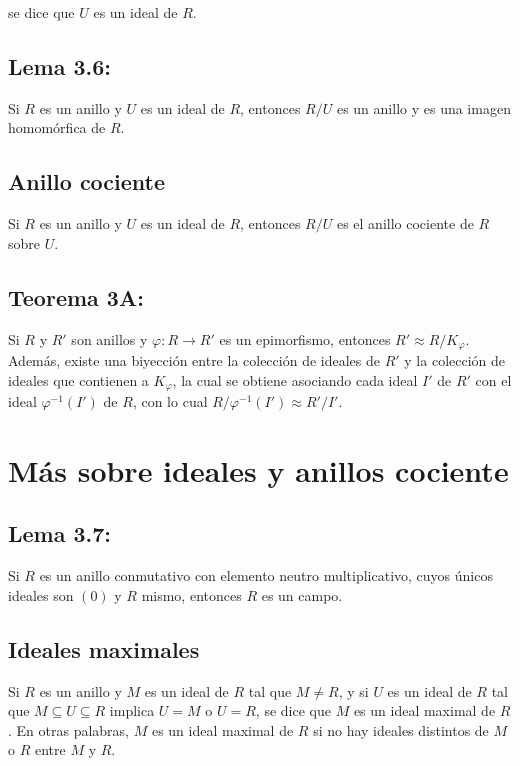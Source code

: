 \documentclass{article}
\begin{document}
se dice que $U$ es un ideal de $R$.

\subsection*{\color{blue} Lema 3.6:}

Si $R$ es un anillo y $U$ es un ideal de $R$, entonces $R/U$ es un anillo y es una imagen homomórfica de $R$.

\subsection*{\color{violet} Anillo cociente}

Si $R$ es un anillo y $U$ es un ideal de $R$, entonces $R/U$ es el anillo cociente de $R$ sobre $U$.

\subsection*{\color{red} Teorema 3A:}

Si $R$ y $R'$ son anillos y $\varphi: R\to R'$ es un epimorfismo, entonces $R'\approx R/K_{\varphi}$. Además, existe una biyección entre la colección de ideales de $R'$ y la colección de ideales que contienen a $K_{\varphi}$, la cual se obtiene asociando cada ideal $I'$ de $R'$ con el ideal $\varphi^{-1}(I')$ de $R$, con lo cual $R/\varphi^{-1}(I')\approx R'/I'$.

\section{Más sobre ideales y anillos cociente}

\subsection*{\color{blue} Lema 3.7:}

Si $R$ es un anillo conmutativo con elemento neutro multiplicativo, cuyos únicos ideales son $(0)$ y $R$ mismo, entonces $R$ es un campo.

\subsection*{\color{violet} Ideales maximales}

Si $R$ es un anillo y $M$ es un ideal de $R$ tal que $M\neq R$, y si $U$ es un ideal de $R$ tal que $M\subseteq U\subseteq R$ implica $U=M$ o $U=R$, se dice que $M$ es un ideal maximal de $R$. En otras palabras, $M$ es un ideal maximal de $R$ si no hay ideales distintos de $M$ o $R$ entre $M$ y $R$.
\end{document}
